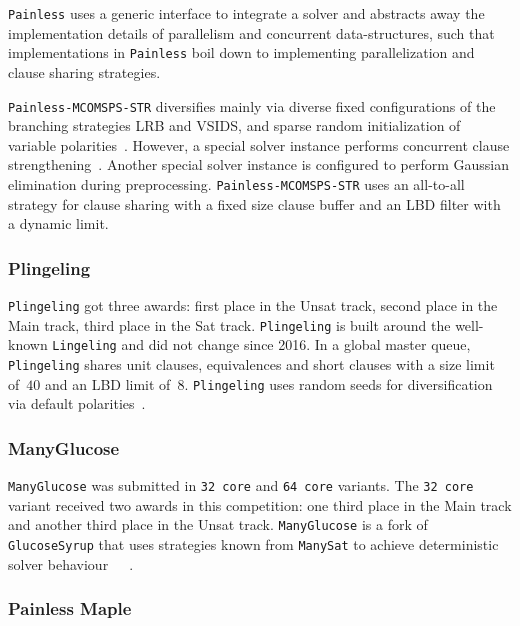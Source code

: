 \documentclass{elsarticle}
\newcommand{\solver}[1]{\texttt{#1}}
\begin{document}
\solver{Painless} uses a generic interface to integrate a solver and abstracts away the implementation details of parallelism and concurrent data-structures, such that implementations in \solver{Painless} boil down to implementing parallelization and clause sharing strategies. 

\solver{Painless-MCOMSPS-STR} diversifies mainly via diverse fixed configurations of the branching strategies LRB and VSIDS, and sparse random initialization of variable polarities~\cite{Balyo:2015:Hordesat}. 
However, a special solver instance performs concurrent clause strengthening~\cite{Wieringa:2013:CCS}. 
Another special solver instance is configured to perform Gaussian elimination during preprocessing. 
\solver{Painless-MCOMSPS-STR} uses an all-to-all strategy for clause sharing with a fixed size clause buffer and an LBD filter with a dynamic limit. 


\subsubsection{Plingeling} 

\solver{Plingeling} got three awards: first place in the Unsat track, second place in the Main track, third place in the Sat track. 
\solver{Plingeling} is built around the well-known \solver{Lingeling} and did not change since 2016. 
In a global master queue, \solver{Plingeling} shares unit clauses, equivalences and short clauses with a size limit of~$40$ and an LBD limit of~$8$. 
\solver{Plingeling} uses random seeds for diversification via default polarities~\cite{Biere:SC2020,Biere:2012:Lingeling}. 


\subsubsection{ManyGlucose}

\solver{ManyGlucose} was submitted in \solver{32 core} and \solver{64 core} variants. 
The \solver{32 core} variant received two awards in this competition: one third place in the Main track and another third place in the Unsat track. 
\solver{ManyGlucose} is a fork of \solver{GlucoseSyrup} that uses strategies known from \solver{ManySat} to achieve deterministic solver behaviour~\cite{Audemard:2018:GlucoseSyrup}~\cite{Audemard:2014:LazyClauseExchange}~\cite{Hamadi:2009:ManySat}. 


\subsubsection{Painless Maple} 
\end{document}

